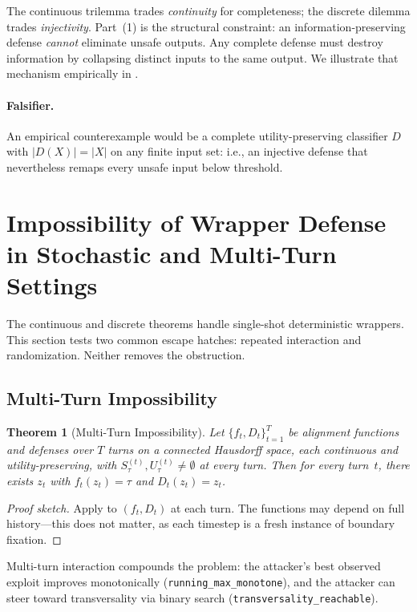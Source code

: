 \documentclass[11pt]{article}
\newtheorem{theorem}{Theorem}[section]
\begin{document}
The continuous trilemma trades \emph{continuity} for completeness;
the discrete dilemma trades \emph{injectivity}. Part~(1) is the
structural constraint: an information-preserving defense \emph{cannot}
eliminate unsafe outputs. Any complete defense must destroy
information by collapsing distinct inputs to the same output. We
illustrate that mechanism empirically in .

\paragraph{Falsifier.}
An empirical counterexample would be a complete utility-preserving
classifier $D$ with $|D(X)| = |X|$ on any finite input set: i.e., an
injective defense that nevertheless remaps every unsafe input below
threshold.


\section{Impossibility of Wrapper Defense in Stochastic and Multi-Turn Settings}
\label{sec:extensions}

The continuous and discrete theorems handle single-shot deterministic
wrappers. This section tests two common escape hatches: repeated
interaction and randomization. Neither removes the obstruction.

\subsection{Multi-Turn Impossibility}

\begin{theorem}[Multi-Turn Impossibility]
\label{thm:multi-turn}
Let $\{f_t, D_t\}_{t=1}^T$ be alignment functions and defenses over
$T$ turns on a connected Hausdorff space, each continuous and
utility-preserving, with $S_\tau^{(t)}, U_\tau^{(t)} \neq \emptyset$
at every turn. Then for every turn~$t$, there exists $z_t$ with
$f_t(z_t) = \tau$ and $D_t(z_t) = z_t$.
\end{theorem}

\begin{proof}[Proof sketch]
Apply  to $(f_t, D_t)$ at each turn. The functions may
depend on full history---this does not matter, as each timestep is a
fresh instance of boundary fixation.
\end{proof}

Multi-turn interaction compounds the problem: the attacker's best
observed exploit improves monotonically
(\texttt{running\_max\_monotone}), and the attacker can steer toward
transversality via binary search (\texttt{transversality\_reachable}).
\end{document}
